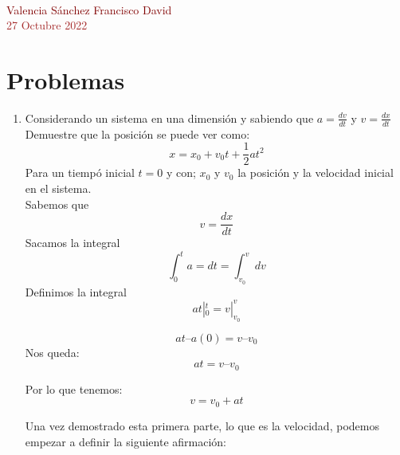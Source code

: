 \documentclass[letterpaper, 12pt]{article}
\begin{document}
{{{\large{}}}\\
{{\large{{\textcolor{Maroon}{Valencia Sánchez Francisco David}}}}\\ 
\normalsize{\textcolor{Brown}{27 Octubre 2022}}}\\}

\section{Problemas}
    

\begin{enumerate}

\item {{Considerando un sistema en una dimensión y sabiendo que $a=\frac{dv}{dt}$ y $v=\frac{dx}{dt}$ Demuestre que la posición se puede ver como:}}
    \begin{equation}
    \label{Ecuación de posición en el eje x}
        x=x_0 + v_0 t + \frac{1}{2} at^2
    \end{equation}
Para un tiempó inicial $t= 0 $ y con; $x_0$ y $v_0 $ la posición y la velocidad inicial en el sistema.\\
Sabemos que 
\begin{equation}
    v=\frac{dx}{dt}
\end{equation}
Sacamos la integral 
\begin {equation}
\int_{0} ^{t} a = dt = \int_{v_0}^{v} dv
\end{equation}
Definimos la integral
\begin {equation}
at |_{0}^{t} = v |_{v_0}^{v} 
\end{equation}

\begin {equation}
at – a(0) = v – v_0
\end{equation}
Nos queda:
\begin{equation}
at = v – v_0
\end{equation}

Por lo que tenemos:
\begin{equation}
\label{Eq de velocidad}
v = v_0 + at 
\end{equation}

Una vez demostrado esta primera parte, lo que es la velocidad, podemos empezar a definir la siguiente afirmación:


\end{enumerate}
\end{document}
